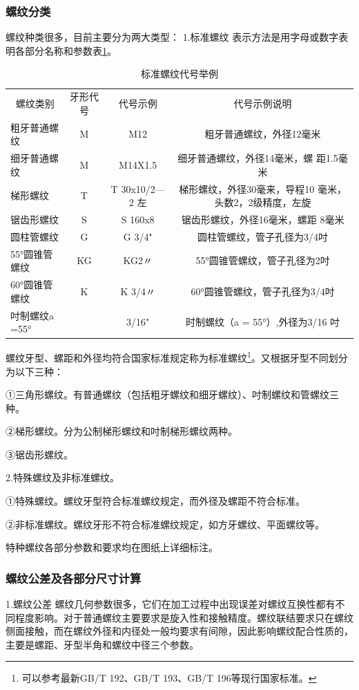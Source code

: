 \documentclass{ctexbook}
\begin{document}
\subsubsection{螺纹分类}
螺纹种类很多，目前主要分为两大类型：
1.标准螺纹 表示方法是用字母或数字表明各部分名称和参数表\ref{tab:biaozhunluowen}。
\begin{table}[htbp]
	\centering
	\caption{标准螺纹代号举例}
	\begin{tabular}{lccc}
		\multicolumn{1}{c}{螺纹类别} & 牙形代号  & 代号示例  & 代号示例说明 \\
		粗牙普通螺纹 & M     & M12   & 粗牙普通螺纹，外径12毫米 \\
		细牙普通螺纹 & M     & M14X1.5 & 细牙普通螺纹，外径14毫米，螺 距1.5毫米 \\
		梯形螺纹  & T     & T 30x10/2—2 左 & 梯形螺纹，外径30毫来，导程10 毫米，头数2，2级精度，左旋 \\
		锯齿形螺纹 & S     & S 160x8 & 锯齿形螺纹，外径16毫米，螺距 8毫米 \\
		圆柱管螺纹 & G     & G 3/4" & 圆柱管螺纹，管子孔径为3/4吋 \\
		55°圆锥管螺纹 & KG    & KG2〃  & 55°圆锥管螺纹，管子孔径为2吋 \\
		60°圆锥管螺纹 & K     & K 3/4〃 & 60°圆锥管螺纹，管子孔径为3/4吋 \\
		吋制螺纹a =55° &       & 3/16" & 时制螺纹（a = 55°）,外径为3/16 吋 \\
	\end{tabular}%
	\label{tab:biaozhunluowen}%
\end{table}%
螺纹牙型、螺距和外径均符合国家标准规定称为标准螺纹\footnote{可以参考最新GB/T 192、GB/T 193、GB/T 196等现行国家标准。}。又根据牙型不同划分为以下三种：

①三角形螺纹。有普通螺纹（包括粗牙螺纹和细牙螺纹）、吋制螺纹和管螺纹三种。

②梯形螺纹。分为公制梯形螺纹和吋制梯形螺纹两种。

③锯齿形螺纹。

2.特殊螺纹及非标准螺纹。

①特殊螺纹。螺纹牙型符合标准螺纹规定，而外径及螺距不符合标准。

②非标准螺纹。螺纹牙形不符合标准螺纹规定，如方牙螺纹、平面螺纹等。

特种螺纹各部分参数和要求均在图纸上详细标注。
\subsubsection{螺纹公差及各部分尺寸计算}
1.螺纹公差
螺纹几何参数很多，它们在加工过程中出现误差对螺纹互换性都有不同程度影响。对于普通螺纹主要要求是旋入性和接触精度。螺纹联结要求只在螺纹侧面接触，而在螺纹外径和内径处一般均要求有间隙，因此影响螺纹配合性质的，主要是螺距、牙型半角和螺纹中径三个参数。
\end{document}
